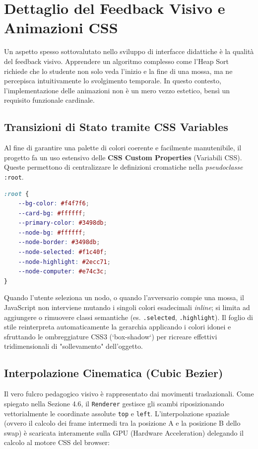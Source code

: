 \documentclass[openany]{theme/uniprthesis}
\begin{document}
\section{Dettaglio del Feedback Visivo e Animazioni CSS}
Un aspetto spesso sottovalutato nello sviluppo di interfacce didattiche è la qualità del feedback visivo. Apprendere un algoritmo complesso come l'Heap Sort richiede che lo studente non solo veda l'inizio e la fine di una mossa, ma ne percepisca intuitivamente lo svolgimento temporale. In questo contesto, l'implementazione delle animazioni non è un mero vezzo estetico, bensì un requisito funzionale cardinale.

\subsection{Transizioni di Stato tramite CSS Variables}
Al fine di garantire una palette di colori coerente e facilmente manutenibile, il progetto fa un uso estensivo delle \textbf{CSS Custom Properties} (Variabili CSS). Queste permettono di centralizzare le definizioni cromatiche nella \textit{pseudoclasse} \texttt{:root}.

\begin{lstlisting}[language=CSS, breaklines=true, basicstyle=\footnotesize\ttfamily, frame=single, caption={Iniezione logica delle Variabili Cromatiche}, keywordstyle=\color{blue}]
:root {
    --bg-color: #f4f7f6;
    --card-bg: #ffffff;
    --primary-color: #3498db;
    --node-bg: #ffffff;
    --node-border: #3498db;
    --node-selected: #f1c40f;
    --node-highlight: #2ecc71;
    --node-computer: #e74c3c;
}
\end{lstlisting}

Quando l'utente seleziona un nodo, o quando l'avversario compie una mossa, il JavaScript non interviene mutando i singoli colori esadecimali \textit{inline}; si limita ad aggiungere o rimuovere classi semantiche (es. \texttt{.selected}, \texttt{.highlight}). Il foglio di stile reinterpreta automaticamente la gerarchia applicando i colori idonei e sfruttando le ombreggiature CSS3 (`box-shadow`) per ricreare effettivi tridimensionali di "sollevamento" dell'oggetto.

\subsection{Interpolazione Cinematica (Cubic Bezier)}
Il vero fulcro pedagogico visivo è rappresentato dai movimenti traslazionali. Come spiegato nella Sezione 4.6, il \texttt{Renderer} gestisce gli scambi riposizionando vettorialmente le coordinate assolute \texttt{top} e \texttt{left}.
L'interpolazione spaziale (ovvero il calcolo dei frame intermedi tra la posizione A e la posizione B dello swap) è scaricata interamente sulla GPU (Hardware Acceleration) delegando il calcolo al motore CSS del browser:
\end{document}
